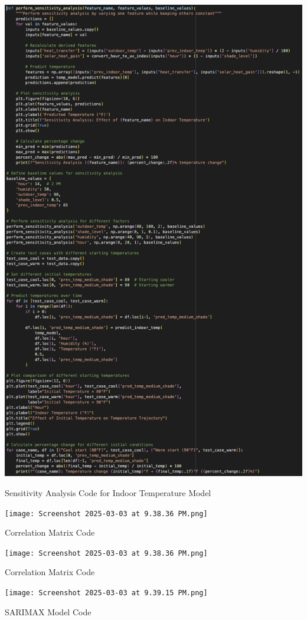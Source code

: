 \documentclass[12pt]{article}
\begin{document}
\begin{center}
\includegraphics[scale=0.75]{sensitivity_analysis.png}
\par Sensitivity Analysis Code for Indoor Temperature Model
\end{center}


\begin{center}
\texttt{[image: Screenshot 2025-03-03 at 9.38.36 PM.png]}
\par Correlation Matrix Code
\end{center}

\begin{center}
\texttt{[image: Screenshot 2025-03-03 at 9.38.36 PM.png]}
\par Correlation Matrix Code
\end{center}

\begin{center}
\texttt{[image: Screenshot 2025-03-03 at 9.39.15 PM.png]}
\par SARIMAX Model Code
\end{center}
\end{document}

